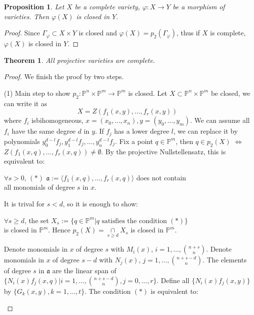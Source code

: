 \documentclass{amsart}
\theoremstyle{plain}
\newtheorem{theorem}{Theorem}
\newtheorem{proposition}{Proposition}
\theoremstyle{definition}
\theoremstyle{remark}
\numberwithin{equation}{section}
\begin{document}
\begin{proposition}
	Let $ X $ be a complete variety, $ \varphi:X\to Y $ be a morphism of varieties. Then $ \varphi(X) $ is closed in $ Y $.
\end{proposition}
\begin{proof}
	Since $ \Gamma_\varphi\subset X\times Y $ is closed and $ \varphi(X)=p_2(\Gamma_\varphi) $, thus if $ X $ is complete, $ \varphi(X) $ is closed in $ Y $.
\end{proof}
\begin{theorem}
	All projective varieties are complete.
\end{theorem}
\begin{proof}
	We finish the proof by two steps.

	(1) Main step to show $ p_2:\mathbb{P}^n\times \mathbb{P}^m\to \mathbb{P}^m $ is closed. Let $ X\subset\mathbb{P}^n\times\mathbb{P}^m $ be closed, we can write it as
	$$
		X=Z(f_1(x,y),\dots,f_r(x,y))
	$$
	where $ f_i $ isbihomogeneous, $ x=(x_0,\dots,x_n),y=(y_0,\dots,y_m) $. We can assume all $ f_i $ have the same degree $ d $ in $ y $. If $ f_j $ has a lower degree $ l $, we can replace it by polynomials $ y_0^{d-l}f_j,y_1^{d-l}f_j,\dots,y_n^{d-l}f_j $. Fix a point $ q\in\mathbb{P}^m $, then $ q\in p_2(X) $ $ \Leftrightarrow $ $ Z(f_1(x,q),\dots,f_r(x,q))\neq \emptyset $. By the projective Nullstellensatz, this is equivalent to:
	\begin{center}
		$ \forall s>0 $, $ (\ast) $ $ \mathfrak{a}:=\langle f_1(x,q),\dots,f_r(x,q)\rangle $ does not contain\\
		 all monomials of degree $ s $ in $ x $.
	\end{center}
	It is trival for $ s<d $, so it is enough to show:
	\begin{center}
		$ \forall s\geq d $, the set $X_s:= \{ q\in\mathbb{P}^m|q \text{ satisfies the condition } (\ast) \} $ \\
		is closed in $ \mathbb{P}^m $.
		 Hence $ p_2(X)=\mathop{\cap}\limits_{s\geq d} X_s $ is closed in $ \mathbb{P}^m $.
	\end{center}
	Denote monomials in $ x $ of degree $ s $ with $ M_i(x) $, $ i=1,\dots,\binom{n+s}{n} $. Denote monomials in $ x $ of degree $ s-d $ with $ N_j(x) $, $ j=1,\dots,\binom{n+s-d}{n} $. The elements of degree $ s $ in $ \mathfrak{a} $ are the linear span of $ \{N_i(x)f_j(x,q)|i=1,\dots,\binom{n+s-d}{n},j=0,\dots,r\} $. Define all  $ \{N_i(x)f_j(x,y)\} $ by $ \{ G_k(x,y),k=1,\dots,t \} $. The condition $ (\ast) $ is equivalent to:
	\begin{center}

\end{center}
\end{proof}
\end{document}
